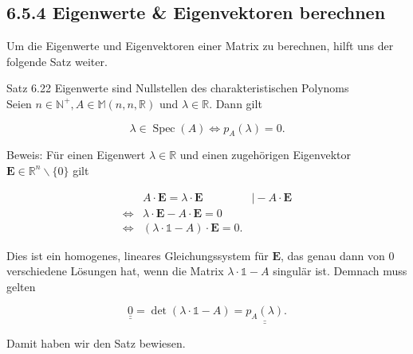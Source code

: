 \documentclass[10pt]{article}
\begin{document}
\subsection*{6.5.4 Eigenwerte \& Eigenvektoren berechnen}
Um die Eigenwerte und Eigenvektoren einer Matrix zu berechnen, hilft uns der folgende Satz weiter.

Satz 6.22 Eigenwerte sind Nullstellen des charakteristischen Polynoms\\
Seien $n \in \mathbb{N}^{+}, A \in \mathbb{M}(n, n, \mathbb{R})$ und $\lambda \in \mathbb{R}$. Dann gilt


\begin{equation*}
\lambda \in \operatorname{Spec}(A) \Leftrightarrow p_{A}(\lambda)=0 . \tag{6.167}
\end{equation*}


Beweis: Für einen Eigenwert $\lambda \in \mathbb{R}$ und einen zugehörigen Eigenvektor $\mathbf{E} \in \mathbb{R}^{n} \backslash\{0\}$ gilt

$$
\begin{array}{lll} 
& A \cdot \mathbf{E}=\lambda \cdot \mathbf{E} & \mid-A \cdot \mathbf{E} \\
\Leftrightarrow & \lambda \cdot \mathbf{E}-A \cdot \mathbf{E}=0 & \\
\Leftrightarrow & (\lambda \cdot \mathbb{1}-A) \cdot \mathbf{E}=0 . &
\end{array}
$$

Dies ist ein homogenes, lineares Gleichungssystem für $\mathbf{E}$, das genau dann von 0 verschiedene Lösungen hat, wenn die Matrix $\lambda \cdot \mathbb{1}-A$ singulär ist. Demnach muss gelten


\begin{equation*}
\underline{\underline{0}}=\operatorname{det}(\lambda \cdot \mathbb{1}-A)=\underline{\underline{p_{A}(\lambda)}} . \tag{6.171}
\end{equation*}


Damit haben wir den Satz bewiesen.
\end{document}
